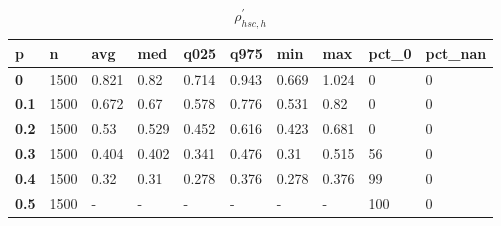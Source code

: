 \begin{table}[h]
 \centering 
\footnotesize
\caption{$\rho_{hsc,h}^\prime $}
\label{tab:alphahsch}
\begin{tabular}[h]{|l|l|l|l|l|l|l|l|l|l|
    } \hline
\textbf{ p} & \textbf{ n} & \textbf{ avg} & \textbf{ med} & \textbf{ q025} & \textbf{ q975} & \textbf{ min} & \textbf{ max} & \textbf{ pct\_0} & \textbf{ pct\_nan}
    \\ \hline
  \textbf{  0} & 1500 & 0.821 &  0.82 & 0.714 & 0.943 & 0.669 & 1.024 &   0 & 0
    \\ \hline
  \textbf{0.1} & 1500 & 0.672 &  0.67 & 0.578 & 0.776 & 0.531 &  0.82 &   0 & 0
    \\ \hline
  \textbf{0.2} & 1500 &  0.53 & 0.529 & 0.452 & 0.616 & 0.423 & 0.681 &   0 & 0
    \\ \hline
  \textbf{0.3} & 1500 & 0.404 & 0.402 & 0.341 & 0.476 &  0.31 & 0.515 &  56 & 0
    \\ \hline
  \textbf{0.4} & 1500 &  0.32 &  0.31 & 0.278 & 0.376 & 0.278 & 0.376 &  99 & 0
    \\ \hline
  \textbf{0.5} & 1500 & - & - & - & - & - & - & 100 & 0
    \\ \hline
 \end{tabular}
 \end{table}
